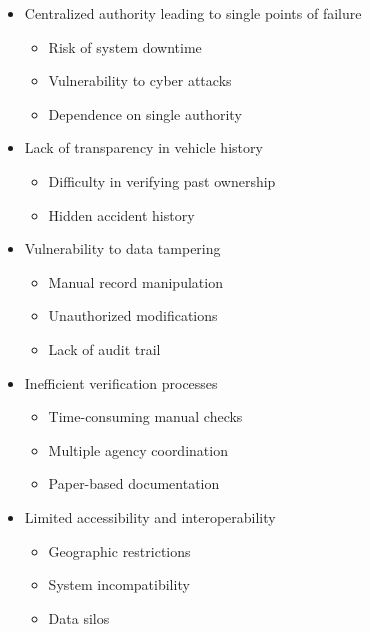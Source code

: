 \documentclass[12pt,a4paper]{article}
\begin{document}
    \begin{itemize}
        \item Centralized authority leading to single points of failure
        \begin{itemize}
            \item Risk of system downtime
            \item Vulnerability to cyber attacks
            \item Dependence on single authority
        \end{itemize}

        \item Lack of transparency in vehicle history
        \begin{itemize}
            \item Difficulty in verifying past ownership
            \item Hidden accident history
        \end{itemize}

        \item Vulnerability to data tampering
        \begin{itemize}
            \item Manual record manipulation
            \item Unauthorized modifications
            \item Lack of audit trail
        \end{itemize}

        \item Inefficient verification processes
        \begin{itemize}
            \item Time-consuming manual checks
            \item Multiple agency coordination
            \item Paper-based documentation
        \end{itemize}

        \item Limited accessibility and interoperability
        \begin{itemize}
            \item Geographic restrictions
            \item System incompatibility
            \item Data silos
        \end{itemize}
    \end{itemize}
\end{document}
